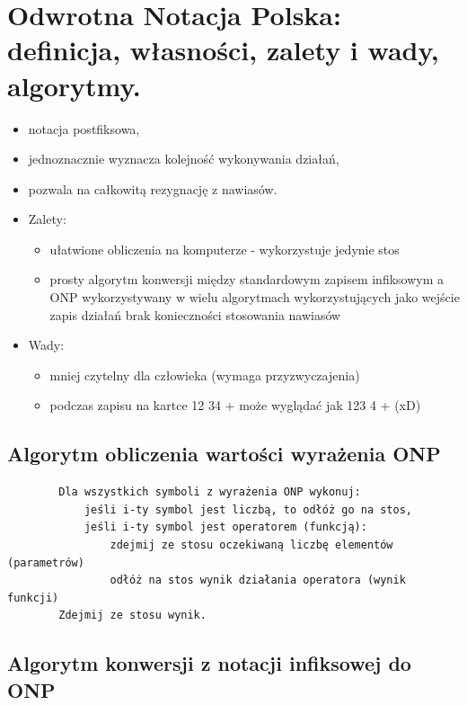 \documentclass[12pt]{article}
\begin{document}
    \newpage
    \section{Odwrotna Notacja Polska: definicja, własności, zalety i wady, algorytmy.}

    \begin{itemize}
        \item notacja postfiksowa,
        \item jednoznacznie wyznacza kolejność wykonywania działań,
        \item pozwala na całkowitą rezygnację z nawiasów.
        \item Zalety:
        \begin{itemize}
            \item ułatwione obliczenia na komputerze - wykorzystuje jedynie stos
            \item prosty algorytm konwersji między standardowym zapisem infiksowym a ONP
            wykorzystywany w wielu algorytmach wykorzystujących jako wejście zapis działań
            brak konieczności stosowania nawiasów
        \end{itemize}
        \item Wady:
        \begin{itemize}
            \item mniej czytelny dla człowieka (wymaga przyzwyczajenia)
            \item podczas zapisu na kartce 12 34 + może wyglądać jak 123 4 + (xD)
        \end{itemize}
    \end{itemize}

    \subsection{Algorytm obliczenia wartości wyrażenia ONP}
    \begin{verbatim}
        Dla wszystkich symboli z wyrażenia ONP wykonuj:
            jeśli i-ty symbol jest liczbą, to odłóż go na stos,
            jeśli i-ty symbol jest operatorem (funkcją):
                zdejmij ze stosu oczekiwaną liczbę elementów  (parametrów)
                odłóż na stos wynik działania operatora (wynik funkcji)
        Zdejmij ze stosu wynik.
    \end{verbatim}

    \subsection{Algorytm konwersji z notacji infiksowej do ONP}
\end{document}
